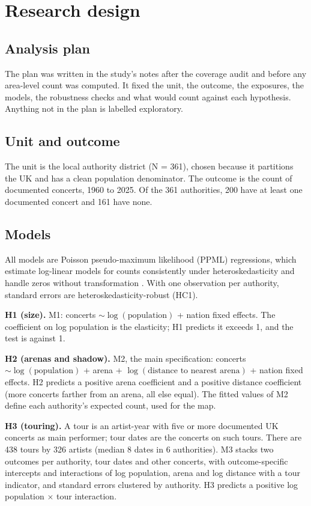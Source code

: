 \documentclass[11pt,a4paper]{article}
\begin{document}
\section{Research design}\label{sec:design}
\subsection{Analysis plan}
The plan was written in the study's notes after the coverage audit and before any area-level count was computed. It fixed the unit, the outcome, the exposures, the models, the robustness checks and what would count against each hypothesis. Anything not in the plan is labelled exploratory.

\subsection{Unit and outcome}
The unit is the local authority district (N = 361), chosen because it partitions the UK and has a clean population denominator. The outcome is the count of documented concerts, 1960 to 2025. Of the 361 authorities, 200 have at least one documented concert and 161 have none.

\subsection{Models}
All models are Poisson pseudo-maximum likelihood (PPML) regressions, which estimate log-linear models for counts consistently under heteroskedasticity and handle zeros without transformation \citep{santos2006}. With one observation per authority, standard errors are heteroskedasticity-robust (HC1).

\textbf{H1 (size).} M1: concerts $\sim \log(\text{population})$ + nation fixed effects. The coefficient on log population is the elasticity; H1 predicts it exceeds 1, and the test is against 1.

\textbf{H2 (arenas and shadow).} M2, the main specification: concerts $\sim \log(\text{population})$ + arena + $\log(\text{distance to nearest arena})$ + nation fixed effects. H2 predicts a positive arena coefficient and a positive distance coefficient (more concerts farther from an arena, all else equal). The fitted values of M2 define each authority's expected count, used for the map.

\textbf{H3 (touring).} A tour is an artist-year with five or more documented UK concerts as main performer; tour dates are the concerts on such tours. There are 438 tours by 326 artists (median 8 dates in 6 authorities). M3 stacks two outcomes per authority, tour dates and other concerts, with outcome-specific intercepts and interactions of log population, arena and log distance with a tour indicator, and standard errors clustered by authority. H3 predicts a positive log population $\times$ tour interaction.
\end{document}
